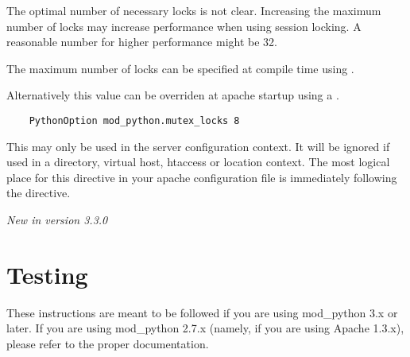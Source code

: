 \begin{description}
  The optimal number of necessary locks is not clear. 
  Increasing the maximum number of locks may increase performance
  when using session locking.  A reasonable number for 
  higher performance might be 32.

  The maximum number of locks can be specified at compile time
  using .

  Alternatively this value can be overriden at apache startup using 
  a .

  \begin{verbatim}
    PythonOption mod_python.mutex_locks 8 
  \end{verbatim}

  This may only be used in the server configuration context.
  It will be ignored if used in a directory, virtual host,
  htaccess or location context. The most logical place for this 
  directive in your apache configuration file is immediately
  following the  directive.

  \emph{New in version 3.3.0}

\end{description}

\section{Testing\label{inst-testing}}

 These instructions are meant to be followed if you are
using mod_python 3.x or later. If you are using mod_python 2.7.x (namely,
if you are using Apache 1.3.x), please refer to the proper documentation.

